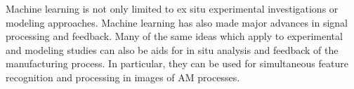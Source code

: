 Machine learning is not only limited to ex situ experimental investigations or modeling approaches. Machine learning has also made major advances in signal processing and feedback. Many of the same ideas which apply to experimental and modeling studies can also be aids for in situ analysis and feedback of the manufacturing process. In particular, they can be used for simultaneous feature recognition and processing in images of AM processes.